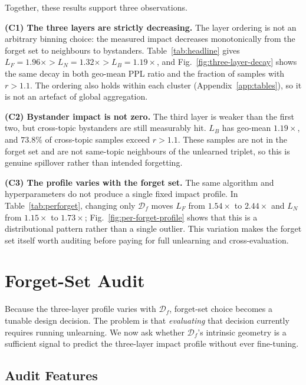 \documentclass[11pt,a4paper]{article}
\newcommand{\Df}{\mathcal{D}_f}
\newcommand{\Lforget}{L_F}
\newcommand{\Lneigh}{L_N}
\newcommand{\Lbyst}{L_B}
\begin{document}
Together, these results support three observations.

\textbf{(C1) The three layers are strictly decreasing.}
The layer ordering is not an arbitrary binning choice: the measured impact
decreases monotonically from the forget set to neighbours to bystanders.
Table~\ref{tab:headline} gives
$\Lforget{=}1.96\times{>}\Lneigh{=}1.32\times{>}\Lbyst{=}1.19\times$, and
Fig.~\ref{fig:three-layer-decay} shows the same decay in both geo-mean PPL
ratio and the fraction of samples with $r{>}1.1$. The ordering also holds
within each cluster (Appendix~\ref{app:tables}), so it is not an artefact of
global aggregation.

\textbf{(C2) Bystander impact is not zero.}
The third layer is weaker than the first two, but cross-topic bystanders are
still measurably hit. $\Lbyst$ has geo-mean $1.19\times$, and $73.8\%$ of
cross-topic samples exceed $r{>}1.1$. These samples are not in the forget set
and are not same-topic neighbours of the unlearned triplet, so this is genuine
spillover rather than intended forgetting.

\textbf{(C3) The profile varies with the forget set.}
The same algorithm and hyperparameters do not produce a single fixed impact
profile. In Table~\ref{tab:perforget}, changing only $\Df$ moves $\Lforget$
from $1.54\times$ to $2.44\times$ and $\Lneigh$ from $1.15\times$ to
$1.73\times$; Fig.~\ref{fig:per-forget-profile} shows that this is a
distributional pattern rather than a single outlier. This variation makes the
forget set itself worth auditing before paying for full unlearning and
cross-evaluation.

\section{Forget-Set Audit}
\label{sec:audit}

Because the three-layer profile varies with $\Df$, forget-set choice becomes a
tunable design decision. The problem is that \emph{evaluating} that decision
currently requires running unlearning. We now ask whether $\Df$'s intrinsic
geometry is a sufficient signal to predict the three-layer impact profile
without ever fine-tuning.

\subsection{Audit Features}
\label{sec:features}
\end{document}
